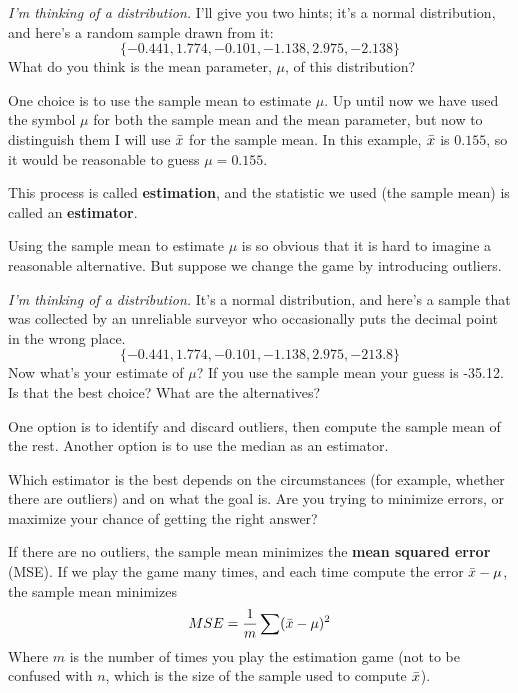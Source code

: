 \documentclass[12pt]{book}
\begin{document}
{\em I'm thinking of a distribution.}  I'll give you two hints; it's a
normal distribution, and here's a random sample drawn from it:
%
\[ \{ -0.441, 1.774, -0.101, -1.138, 2.975, -2.138 \} \]
%
What do you think is the mean parameter, $\mu$, of this distribution?


\newcommand{\ybar}{\bar{y}}

One choice is to use the sample mean to estimate $\mu$.  Up
until now we have used the symbol $\mu$ for both the sample mean and
the mean parameter, but now to distinguish them I will use $\bar{x}$
for the sample mean.  In this example, $\bar{x}$ is $0.155$, so it would
be reasonable to guess $\mu = 0.155$.

This process is called {\bf estimation}, and the statistic we used
(the sample mean) is called an {\bf estimator}.


Using the sample mean to estimate $\mu$ is so obvious that it is hard
to imagine a reasonable alternative.  But suppose we change the game by
introducing outliers.  


{\em I'm thinking of a distribution.}  It's a normal distribution, and
here's a sample that was collected by an unreliable surveyor who
occasionally puts the decimal point in the wrong place.
%
\[ \{ -0.441, 1.774, -0.101, -1.138, 2.975, -213.8 \} \]
%
Now what's your estimate of $\mu$?  If you use the sample mean your
guess is -35.12.  Is that the best choice?  What are the alternatives?


One option is to identify and discard outliers, then compute the sample
mean of the rest.  Another option is to use the median as an estimator.


Which estimator is the best depends on the circumstances (for example,
whether there are outliers) and on what the goal is.  Are you
trying to minimize errors, or maximize your chance of getting the
right answer?


If there are no outliers, the sample mean minimizes the {\bf mean squared
error} (MSE).  If we play the game many times, and each time
compute the error $\bar{x} - \mu$, the sample mean minimizes
%
\[ MSE = \frac{1}{m} \sum (\bar{x} - \mu)^2 \]
%
Where $m$ is the number of times you play the estimation game (not to
be confused with $n$, which is the size of the sample used to compute
$\bar{x}$). 
\end{document}
